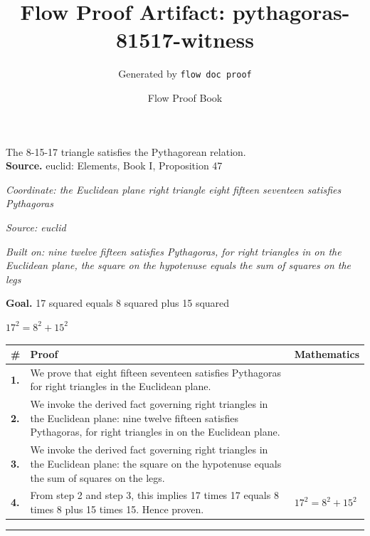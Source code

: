 \documentclass[11pt]{article}
\title{Flow Proof Artifact: pythagoras-81517-witness}
\author{Generated by \texttt{flow doc proof}}
\date{Flow Proof Book}
\theoremstyle{definition}
\begin{document}
\maketitle
The 8-15-17 triangle satisfies the Pythagorean relation.\\[0.5em]
\textbf{Source.} euclid: Elements, Book I, Proposition 47\\[0.5em]
\bigskip
{}\par
\smallskip\noindent\textit{Coordinate: the Euclidean plane \cdot right triangle \cdot eight fifteen seventeen satisfies Pythagoras}\par
\smallskip\noindent\textit{Source: euclid}\par
\smallskip\noindent\textit{Built on: nine twelve fifteen satisfies Pythagoras, for right triangles in on the Euclidean plane, the square on the hypotenuse equals the sum of squares on the legs}\par
\medskip
\noindent\textbf{Goal.} 17 squared equals 8 squared plus 15 squared\par
\noindent$\displaystyle 17^{2} = 8^{2} + 15^{2}$\par
\medskip
\noindent
\begin{tabular}{@{} >{\raggedright\arraybackslash}p{} >{\raggedright\arraybackslash}p{} >{\raggedleft\arraybackslash}p{} @{}}
\textbf{\#} & \textbf{Proof} & \textbf{Mathematics} \\
\midrule
\textbf{1.} & We prove that eight fifteen seventeen satisfies Pythagoras for right triangles in the Euclidean plane. & \\[0.45em]
\textbf{2.} & We invoke the derived fact governing right triangles in the Euclidean plane: nine twelve fifteen satisfies Pythagoras, for right triangles in on the Euclidean plane. & \\[0.45em]
\textbf{3.} & We invoke the derived fact governing right triangles in the Euclidean plane: the square on the hypotenuse equals the sum of squares on the legs. & \\[0.45em]
\textbf{4.} & From step 2 and step 3, this implies 17 times 17 equals 8 times 8 plus 15 times 15. Hence proven. & $\displaystyle 17^{2} = 8^{2} + 15^{2}$ \\[0.45em]
\bottomrule
\end{tabular}
\label{thm:Geometry-right triangle-eight_fifteen_seventeen_satisfies_pythagoras}
\par\medskip\hrule
\end{document}
